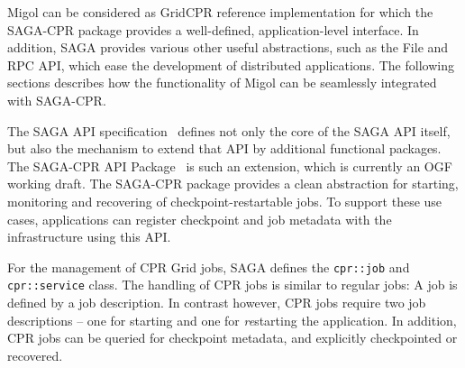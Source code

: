 \documentclass[conference,final]{IEEEtran}
\newcommand{\up}{\vspace*{-1em}}
\begin{document}
Migol can be considered as GridCPR reference implementation for which
the SAGA-CPR package provides a well-defined, application-level
interface.  In addition, SAGA provides various other useful
abstractions, such as the File and RPC API, which ease the development
of distributed applications. The following sections describes how the
functionality of Migol can be seamlessly integrated with SAGA-CPR.



\up
{}

\up The SAGA API specification~\cite{saga_gfd90} defines not only the
core of the SAGA API itself, but also the mechanism to extend that API
by additional functional packages.  The SAGA-CPR API
Package~\cite{saga_cpr_draft} is such an extension, which is currently
an OGF working draft.  The SAGA-CPR package provides a clean
abstraction for starting, monitoring and recovering of
checkpoint-restartable jobs.
To support these use cases, applications can register checkpoint and job metadata with the infrastructure using this API. 

For the management of CPR Grid jobs, SAGA defines the
\texttt{cpr::job} and \texttt{cpr::service} class.
The handling of CPR jobs is similar to regular jobs: A job is defined
by a job description. In contrast however, CPR jobs require
two job descriptions -- one for starting and one for
\textit{re}starting the application.
In addition, CPR jobs can be queried for
checkpoint metadata, and explicitly checkpointed or recovered.

\end{document}
